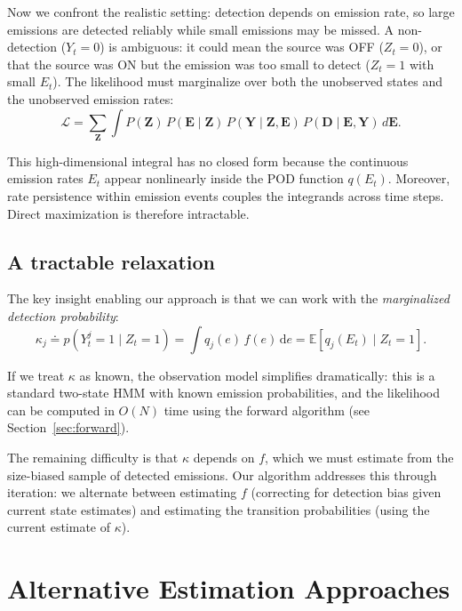 \documentclass[11pt]{article}
\newcommand{\E}{\mathbb{E}}
\begin{document}
Now we confront the realistic setting: detection depends on emission rate, so large emissions are detected reliably while small emissions may be missed. A non-detection ($Y_t = 0$) is ambiguous: it could mean the source was OFF ($Z_t = 0$), or that the source was ON but the emission was too small to detect ($Z_t = 1$ with small $E_t$). The likelihood must marginalize over both the unobserved states and the unobserved emission rates:
\begin{equation}
    \mathcal{L} = \sum_{\mathbf{Z}} \int P(\mathbf{Z}) \, P(\mathbf{E} \mid \mathbf{Z}) \, P(\mathbf{Y} \mid \mathbf{Z}, \mathbf{E}) \, P(\mathbf{D} \mid \mathbf{E}, \mathbf{Y}) \, d\mathbf{E}.
    \label{eq:full_likelihood_SI}
\end{equation}

This high-dimensional integral has no closed form because the continuous emission rates $E_t$ appear nonlinearly inside the POD function $q(E_t)$. Moreover, rate persistence within emission events couples the integrands across time steps. Direct maximization is therefore intractable.

\subsection{A tractable relaxation}

The key insight enabling our approach is that we can work with the \emph{marginalized detection probability}:
\begin{equation}
    \kappa_j
    \doteq p(Y_{t}^j=1\mid Z_t=1)
    = \int q_j(e)\,f(e)\,\mathrm{d}e
    =\E[q_j(E_t) \mid Z_t = 1].
\end{equation}

If we treat $\kappa$ as known, the observation model simplifies dramatically: this is a standard two-state HMM with known emission probabilities, and the likelihood can be computed in $O(N)$ time using the forward algorithm (see Section~\ref{sec:forward}).

The remaining difficulty is that $\kappa$ depends on $f$, which we must estimate from the size-biased sample of detected emissions. Our algorithm addresses this through iteration: we alternate between estimating $f$ (correcting for detection bias given current state estimates) and estimating the transition probabilities (using the current estimate of $\kappa$).

\section{Alternative Estimation Approaches}
\label{sec:alternatives}
\end{document}
